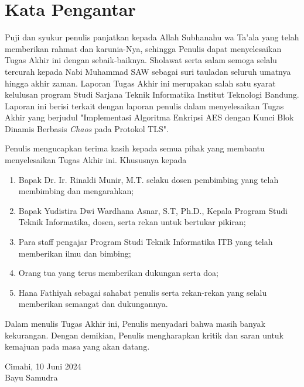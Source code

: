 \chapter*{Kata Pengantar}

Puji dan syukur penulis panjatkan kepada Allah Subhanahu wa Ta'ala yang telah memberikan rahmat dan karunia-Nya, sehingga Penulis dapat menyelesaikan Tugas Akhir ini dengan sebaik-baiknya. Sholawat serta salam semoga selalu tercurah kepada Nabi Muhammad SAW sebagai suri tauladan seluruh umatnya hingga akhir zaman. Laporan Tugas Akhir ini merupakan salah satu syarat kelulusan program Studi Sarjana Teknik Informatika Institut Teknologi Bandung. Laporan ini berisi terkait dengan laporan penulis dalam menyelesaikan Tugas Akhir yang berjudul "Implementasi Algoritma Enkripsi AES dengan Kunci Blok Dinamis Berbasis \emph{Chaos} pada Protokol TLS".

Penulis mengucapkan terima kasih kepada semua pihak yang membantu menyelesaikan Tugas Akhir ini. Khususnya kepada
\begin{enumerate}
  \item Bapak Dr. Ir. Rinaldi Munir, M.T. selaku dosen pembimbing yang telah membimbing dan mengarahkan;
  \item Bapak Yudistira Dwi Wardhana Asnar, S.T, Ph.D., Kepala Program Studi Teknik Informatika, dosen, serta rekan untuk bertukar pikiran;
  \item Para staff pengajar Program Studi Teknik Informatika ITB yang telah memberikan ilmu dan bimbing;
  \item Orang tua yang terus memberikan dukungan serta doa;
  \item Hana Fathiyah sebagai sahabat penulis serta rekan-rekan yang selalu memberikan semangat dan dukungannya.
\end{enumerate}

Dalam menulis Tugas Akhir ini, Penulis menyadari bahwa masih banyak kekurangan. Dengan demikian, Penulis mengharapkan kritik dan saran untuk kemajuan pada masa yang akan datang.

\begin{flushright}
  Cimahi, 10 Juni 2024 \\

  Bayu Samudra
\end{flushright}